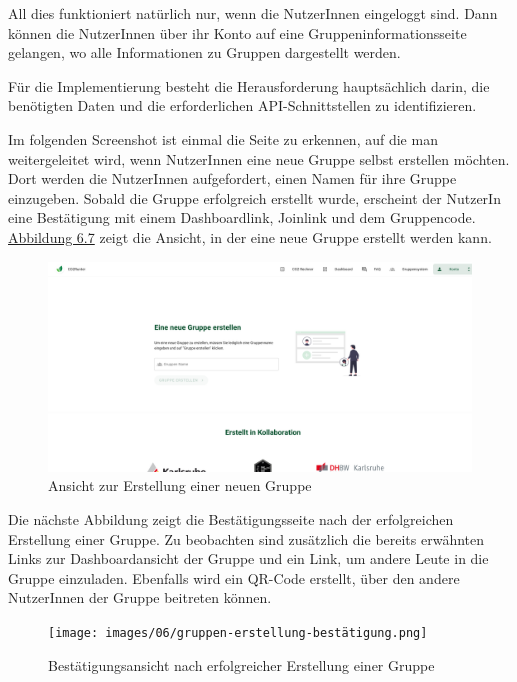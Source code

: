 All dies funktioniert natürlich nur, wenn die NutzerInnen eingeloggt sind. Dann können die NutzerInnen über ihr Konto auf eine Gruppeninformationsseite gelangen, wo alle Informationen zu Gruppen dargestellt werden.

Für die Implementierung besteht die Herausforderung hauptsächlich darin, die benötigten Daten und die erforderlichen \acs{API}-Schnittstellen zu identifizieren.

Im folgenden Screenshot ist einmal die Seite zu erkennen, auf die man weitergeleitet wird, wenn NutzerInnen eine neue Gruppe selbst erstellen möchten. Dort werden die NutzerInnen aufgefordert, einen Namen für ihre Gruppe einzugeben. Sobald die Gruppe erfolgreich erstellt wurde, erscheint der NutzerIn eine Bestätigung mit einem Dashboardlink, Joinlink und dem Gruppencode. \hyperref[fig:neue-gruppe-design]{Abbildung 6.7} zeigt die Ansicht, in der eine neue Gruppe erstellt werden kann.

\begin{figure}[H]
    \centering
    \includegraphics[width=1\textwidth]{images/06/gruppe-erstellen-design.png}
    \caption{Ansicht zur Erstellung einer neuen Gruppe}
    \label{fig:neue-gruppe-design}
\end{figure}

Die nächste Abbildung zeigt die Bestätigungsseite nach der erfolgreichen Erstellung einer Gruppe. Zu beobachten sind zusätzlich die bereits erwähnten Links zur Dashboardansicht der Gruppe und ein Link, um andere Leute in die Gruppe einzuladen. Ebenfalls wird ein QR-Code erstellt, über den andere NutzerInnen der Gruppe beitreten können.

\begin{figure}[H]
    \centering
    \texttt{[image: images/06/gruppen-erstellung-bestätigung.png]}
    \caption{Bestätigungsansicht nach erfolgreicher Erstellung einer Gruppe}
    \label{fig:gruppe-erfolgreich-erstellt}
\end{figure}

